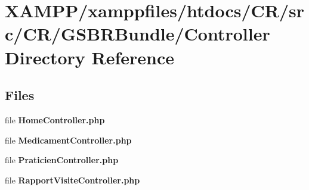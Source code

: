 \section{X\+A\+M\+P\+P/xamppfiles/htdocs/\+C\+R/src/\+C\+R/\+G\+S\+B\+R\+Bundle/\+Controller Directory Reference}
\label{dir_5250f237c61f8e816bebafee17efc739}
\subsection*{Files}
\begin{DoxyCompactItemize}
\item 
file {\bfseries Home\+Controller.\+php}
\item 
file {\bfseries Medicament\+Controller.\+php}
\item 
file {\bfseries Praticien\+Controller.\+php}
\item 
file {\bfseries Rapport\+Visite\+Controller.\+php}
\end{DoxyCompactItemize}
